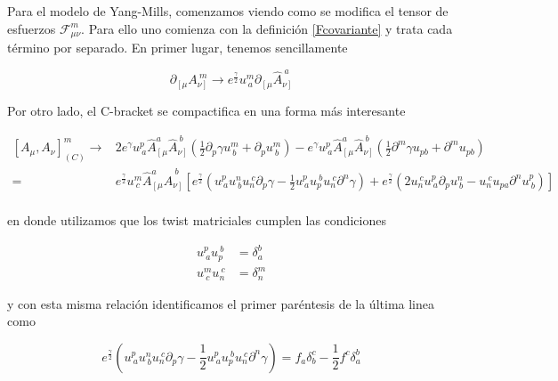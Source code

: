 \documentclass{article}
\numberwithin{equation}{section}
\begin{document}
Para el modelo de Yang-Mills, comenzamos viendo como se modifica el tensor de esfuerzos $ \mathcal{F}_{\mu \nu}^m $. Para ello uno comienza con la definición \ref{Fcovariante} y trata cada término por separado. En primer lugar, tenemos sencillamente

\begin{equation}
\partial_{\left[\mu\right.} A_{\left. \nu\right]}^{\ m} \longrightarrow e^{\frac{\gamma}{2}} u^m_{\ a} \partial_{\left[\mu\right.} \hat{A}_{\left. \nu\right]}^{\ a}
\end{equation}

Por otro lado, el C-bracket se compactifica en una forma más interesante

\begin{equation}
\begin{aligned}
\left[A_{\mu}, A_{\nu} \right]_{(C)}^{m} \longrightarrow& 2 e^{\gamma} u^p_{\ a} \hat{A}_{\left[\mu \right.}^a \hat{A}_{\left. \nu\right]}^{\ b} \left( \frac{1}{2} \partial_p \gamma u^m_{\ b} + \partial_p u^m_{\ b} \right) - e^{\gamma} u^p_{\ a} \hat{A}_{\left[\mu \right.}^a \hat{A}_{\left. \nu\right]}^{\ b} \left( \frac{1}{2} \partial^m \gamma u_{p b} + \partial^m u_{p b} \right)\\
=& e^{\frac{\gamma}{2}} u^m_{\ c} \hat{A}_{\left[\mu \right.}^a \hat{A}_{\left. \nu\right]}^{\ b} \left[ e^{\frac{\gamma}{2}} \left( u^p_{\ a} u^{n}_{\ b} u_n^{\ c} \partial_p \gamma - \frac{1}{2} u^p_{\ a} u_{p}^{\ b} u_n^{\ c} \partial^n \gamma \right) + e^{\frac{\gamma}{2}} \left(2 u_n^{\ c} u^p_{\ a} \partial_p u^n_{\ b}  - u_n^{\ c} u_{p a} \partial^n u^{p}_{\ b}\right)\right]\\
\end{aligned}
\end{equation}

en donde utilizamos que los twist matriciales cumplen las condiciones

\begin{equation}\label{uinversas}
\begin{aligned}
u^p_{\ a} u_p^{\ b} &=\delta_{a}^{b}\\
u^m_{\ c} u_n^{\ c} &=\delta^{m}_{n}
\end{aligned} 
\end{equation}

y con esta misma relación identificamos el primer paréntesis de la última linea como

\begin{equation}
e^{\frac{\gamma}{2}} \left( u^p_{\ a} u^{n}_{\ b} u_n^{\ c} \partial_p \gamma - \frac{1}{2} u^p_{\ a} u_{p}^{\ b} u_n^{\ c} \partial^n \gamma \right) = f_a \delta_b^c - \frac{1}{2} f^c \delta_a^b
\end{equation} 
\end{document}
